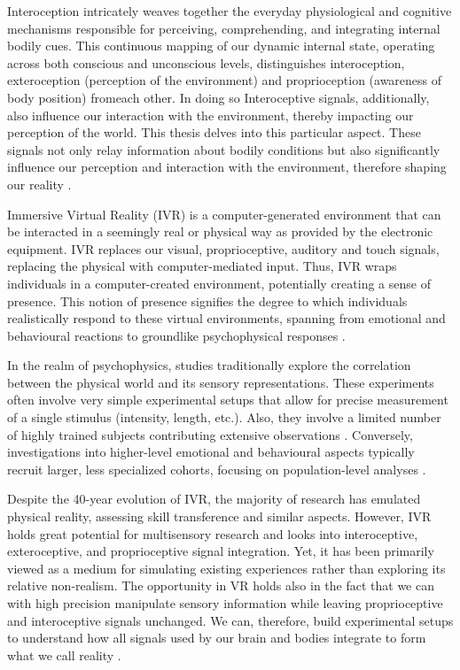 \documentclass[12pt,oneside,openright]{report}
\begin{document}
Interoception intricately weaves together the everyday physiological and cognitive mechanisms responsible for perceiving, comprehending, and integrating internal bodily cues. This continuous mapping of our dynamic internal state, operating across both conscious and unconscious levels, distinguishes interoception, exteroception (perception of the environment) and proprioception (awareness of body position) fromeach other. In doing so Interoceptive signals, additionally, also influence our interaction with the environment, thereby impacting our perception of the world. This thesis delves into this particular aspect. These signals not only relay information about bodily conditions but also significantly influence our perception and interaction with the environment, therefore shaping our reality \parencite{Galvez-Pol2022-vb}.

Immersive Virtual Reality (IVR) is a computer-generated environment that can be interacted in a seemingly real or physical way as provided by the electronic equipment. IVR replaces our visual, proprioceptive, auditory and touch signals, replacing the physical with computer-mediated input. Thus, IVR wraps individuals in a computer-created environment, potentially creating a sense of presence. This notion of presence signifies the degree to which individuals realistically respond to these virtual environments, spanning from emotional and behavioural reactions to groundlike psychophysical responses \parencite{SanchezVives2005FromPT}.

In the realm of psychophysics, studies traditionally explore the correlation between the physical world and its sensory representations. These experiments often involve very simple experimental setups that allow for precise measurement of a single stimulus (intensity, length, etc.). Also, they involve a limited number of highly trained subjects contributing extensive observations \parencite{KINGDOM2012234,WASKOM2019100}. Conversely, investigations into higher-level emotional and behavioural aspects typically recruit larger, less specialized cohorts, focusing on population-level analyses \parencite{WASKOM2019100}.

Despite the 40-year evolution of IVR, the majority of research has emulated physical reality, assessing skill transference and similar aspects. However, IVR holds great potential for multisensory research and looks into interoceptive, exteroceptive, and proprioceptive signal integration. Yet, it has been primarily viewed as a medium for simulating existing experiences rather than exploring its relative non-realism. The opportunity in VR holds also in the fact that we can with high precision manipulate sensory information while leaving proprioceptive and interoceptive signals unchanged. We can, therefore,  build experimental setups to understand how all signals used by our brain and bodies integrate to form what we call reality \parencite{Vasser2020GuidelinesFI, deGelder2018VirtualRA}.
\end{document}
